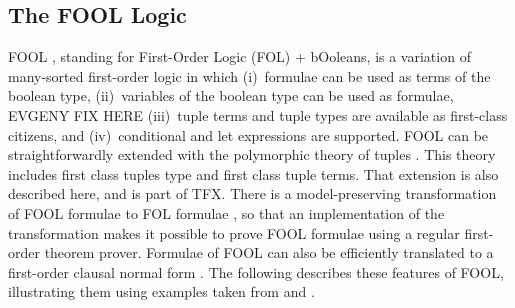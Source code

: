 \documentclass{easychair}
\begin{document}

\subsection{The FOOL Logic}
\label{FOOL}
FOOL \cite{KKV15}, standing for First-Order Logic (FOL) + bOoleans, is a 
variation of many-sorted first-order logic in which (i)~formulae can
be used as terms of the boolean type, (ii)~variables of the boolean type can
be used as formulae, 
EVGENY FIX HERE
(iii)~tuple terms and tuple types are available as
first-class citizens, and (iv)~conditional and let expressions are supported.
FOOL can be straightforwardly extended with the polymorphic theory of tuples
\cite{KKV18}. This theory includes first class tuples type and first class tuple
terms. 
That extension is also described here, and is part of TFX.
There is a model-preserving transformation of FOOL formulae to FOL formulae
\cite{KKV15}, so that an implementation of the transformation makes it 
possible to prove FOOL formulae using a regular first-order theorem prover. 
Formulae of FOOL can also be efficiently translated to a first-order clausal 
normal form \cite{KK+16-GCAI}.
The following describes these features of FOOL, illustrating
them using examples taken from \cite{KK+16} and \cite{KKV18}.
\end{document}
